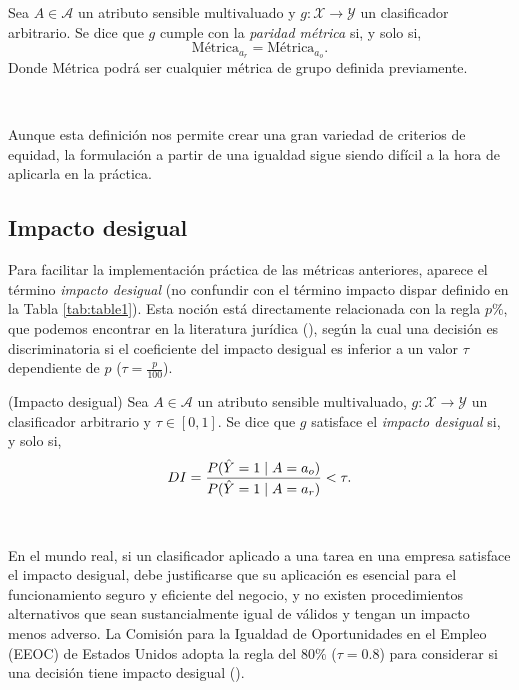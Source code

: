 \documentclass[oneside,openright,titlepage,numbers=noenddot,openany,headinclude,footinclude=true,
cleardoublepage=empty,abstractoff,BCOR=5mm,paper=a4,fontsize=12pt,main=spanish]{scrreprt}
\begin{document}
\begin{definition}\label{def:parmetr}
Sea $A \in \mathcal{A}$ un atributo sensible multivaluado y $g\colon \mathcal{X} \to \mathcal{Y}$ un clasificador arbitrario. Se dice que $g$ cumple con la \textit{paridad métrica} si, y solo si, $$\text{Métrica}_{a_r}=\text{Métrica}_{a_o}.$$
Donde Métrica podrá ser cualquier métrica de grupo definida previamente. 
\end{definition}\

Aunque esta definición nos permite crear una gran variedad de criterios de equidad, la formulación a partir de una igualdad sigue siendo difícil a la hora de aplicarla en la práctica. 

\subsection{Impacto desigual} \label{subsec:impactdesi}

Para facilitar la implementación práctica de las métricas anteriores, aparece el término \textit{impacto desigual} (no confundir con el término impacto dispar definido en la Tabla \ref{tab:table1}). Esta noción está directamente relacionada con la regla $p\%$, que podemos encontrar en la literatura jurídica (\cite{prule2018}), según la cual una decisión es discriminatoria si el coeficiente del impacto desigual es inferior a un valor $\tau$ dependiente de $p$ ($\tau=\frac{p}{100}$).\\

\begin{definition}(Impacto desigual) \label{def:mdi}
Sea $A \in \mathcal{A}$ un atributo sensible multivaluado, $g\colon \mathcal{X} \to \mathcal{Y}$ un clasificador arbitrario y $\tau\in [0,1]$. Se dice que $g$ satisface el \textit{impacto desigual} si, y solo si,
\begin{equation} \label{eq:1p}
    DI = \frac{\displaystyle P(\hat{Y}=1 \mid A=a_o)}{\displaystyle P(\hat{Y}=1 \mid A=a_r)} < \tau.
\end{equation}
\end{definition}\

En el mundo real, si un clasificador aplicado a una tarea en una empresa satisface el impacto desigual, debe justificarse que su aplicación es esencial para el funcionamiento seguro y eficiente del negocio, y no existen procedimientos alternativos que sean sustancialmente igual de válidos y tengan un impacto menos adverso. La Comisión para la Igualdad de Oportunidades en el Empleo (EEOC) de Estados Unidos adopta la regla del $80\%$ ($\tau = 0.8$) para considerar si una decisión tiene impacto desigual (\cite{adverse2009}).
\end{document}
